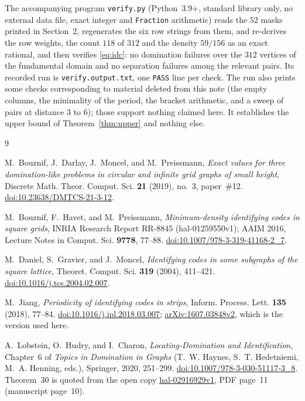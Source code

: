 \documentclass[11pt]{amsart}
\theoremstyle{remark}
\begin{document}
The accompanying program \texttt{verify.py} (Python~3.9+, standard library only, no external
data file, exact integer and \texttt{Fraction} arithmetic) reads the $52$ masks printed in
Section~2, regenerates the six row strings from them, and re-derives the row weights, the count
$118$ of $312$ and the density $59/156$ as an exact rational, and then verifies \eqref{eq:idc}:
no domination failures over the $312$ vertices of the fundamental domain and no separation
failures among the relevant pairs. Its recorded run is \texttt{verify.output.txt}, one
\texttt{PASS} line per check. The run also prints some checks corresponding to material deleted
from this note (the empty columns, the minimality of the period, the bracket arithmetic, and a
sweep of pairs at distance $3$ to $6$); those support nothing claimed here. It establishes the
upper bound of Theorem~\ref{thm:upper} and nothing else.

\begin{thebibliography}{9}

M.~Bouznif, J.~Darlay, J.~Moncel, and M.~Preissmann,
\emph{Exact values for three domination-like problems in circular and infinite grid graphs
of small height},
Discrete Math. Theor. Comput. Sci. \textbf{21} (2019), no.~3, paper~\#12.
\href{https://doi.org/10.23638/DMTCS-21-3-12}{doi:10.23638/DMTCS-21-3-12}.

M.~Bouznif, F.~Havet, and M.~Preissmann,
\emph{Minimum-density identifying codes in square grids},
INRIA Research Report RR-8845 (hal-01259550v1); AAIM 2016,
Lecture Notes in Comput. Sci. \textbf{9778}, 77--88.
\href{https://doi.org/10.1007/978-3-319-41168-2_7}{doi:10.1007/978-3-319-41168-2\_7}.

M.~Daniel, S.~Gravier, and J.~Moncel,
\emph{Identifying codes in some subgraphs of the square lattice},
Theoret. Comput. Sci. \textbf{319} (2004), 411--421.
\href{https://doi.org/10.1016/j.tcs.2004.02.007}{doi:10.1016/j.tcs.2004.02.007}.

M.~Jiang,
\emph{Periodicity of identifying codes in strips},
Inform. Process. Lett. \textbf{135} (2018), 77--84.
\href{https://doi.org/10.1016/j.ipl.2018.03.007}{doi:10.1016/j.ipl.2018.03.007};
\href{https://arxiv.org/abs/1607.03848v2}{arXiv:1607.03848v2}, which is the version
used here.

A.~Lobstein, O.~Hudry, and I.~Charon,
\emph{Locating-Domination and Identification},
Chapter~6 of \emph{Topics in Domination in Graphs} (T.~W. Haynes, S.~T. Hedetniemi,
M.~A. Henning, eds.), Springer, 2020, 251--299.
\href{https://doi.org/10.1007/978-3-030-51117-3_8}{doi:10.1007/978-3-030-51117-3\_8}.
Theorem~30 is quoted from the open copy
\href{https://hal.science/hal-02916929/document}{hal-02916929v1}, PDF page~11
(manuscript page~10).

\end{thebibliography}
\end{document}

